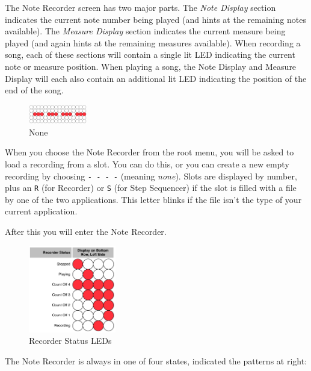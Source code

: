 \documentclass{article}
\begin{document}
The Note Recorder screen has two major parts.  The {\it Note Display} section indicates the current note number being played (and hints at the remaining notes available).  The {\it Measure Display} section indicates the current measure being played (and again hints at the remaining measures available).  When recording a song, each of these sections will contain a single lit LED indicating the current note or measure position.  When playing a song, the Note Display and Measure Display will each also contain an additional lit LED indicating the position of the end of the song.

\begin{figure}
\includegraphics[width=1in]{none.pdf}
\vspace{-2em}\caption{\small None}\vspace{-1em}
\label{none}
\end{figure}

When you choose the Note Recorder from the root menu, you will be asked to load a recording from a slot.  You can do this, or you can create a new empty recording by choosing \texttt{-~-~-~-} (meaning {\it none}).  Slots are displayed by number, plus an \texttt{R} (for Recorder) or \texttt{S} (for Step Sequencer) if the slot is filled with a file by one of the two applications.  This letter blinks if the file isn't the type of your current application.

After this you will enter the Note Recorder.

\begin{figure}
\includegraphics[width=1.5in]{recorderstatus.pdf}
\vspace{-2em}\caption{\small Recorder Status LEDs}\vspace{-4em}
\label{recorderstatus}
\end{figure}

The Note Recorder is always in one of four states, indicated the patterns at right:
\end{document}
